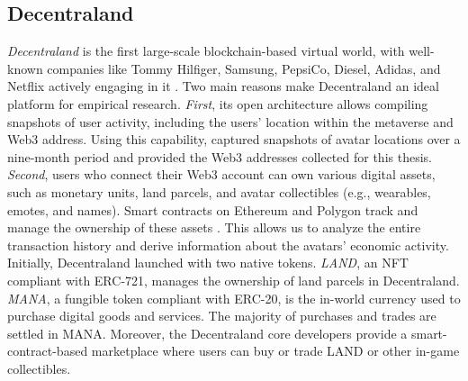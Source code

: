 \documentclass[12pt,a4paper,titlepage,oneside,english]{article}
\begin{document}
\subsection{Decentraland}
\textit{Decentraland} is the first large-scale blockchain-based virtual world, with well-known companies like Tommy Hilfiger, Samsung, PepsiCo, Diesel, Adidas, and Netflix actively engaging in it \citep{metaverse-retailing2023}.\newline
Two main reasons make Decentraland an ideal platform for empirical research.
\textit{First}, its open architecture allows compiling snapshots of user activity, including the users' location within the metaverse and Web3 address. Using this capability, \cite{metaverse-retailing2023} captured snapshots of avatar locations over a nine-month period and provided the Web3 addresses collected for this thesis.\newline
\textit{Second}, users who connect their Web3 account can own various digital assets, such as monetary units, land parcels, and avatar collectibles (e.g., wearables, emotes, and names). Smart contracts on Ethereum and Polygon track and manage the ownership of these assets \citep{goldbergschaer2023}. This allows us to analyze the entire transaction history and derive information about the avatars' economic activity. \newline
Initially, Decentraland launched with two native tokens. \textit{LAND}, an NFT compliant with ERC-721, manages the ownership of land parcels in Decentraland. \textit{MANA}, a fungible token compliant with ERC-20, is the in-world currency used to purchase digital goods and services. The majority of purchases and trades are settled in MANA. \newline 
Moreover, the Decentraland core developers provide a smart-contract-based marketplace where users can buy or trade LAND or other in-game collectibles.
\end{document}
